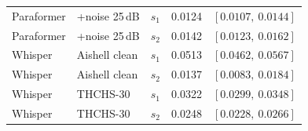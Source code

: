 \documentclass[11pt]{article}
\begin{document}
\begin{table}[t]
\begin{tabular}{lllrc}
    Paraformer & +noise 25\,dB      & $s_1$ & 0.0124 & $[0.0107,\ 0.0144]$ \\
    Paraformer & +noise 25\,dB      & $s_2$ & 0.0142 & $[0.0123,\ 0.0162]$ \\
    Whisper    & Aishell clean      & $s_1$ & 0.0513 & $[0.0462,\ 0.0567]$ \\
    Whisper    & Aishell clean      & $s_2$ & 0.0137 & $[0.0083,\ 0.0184]$ \\
    Whisper    & THCHS-30           & $s_1$ & 0.0322 & $[0.0299,\ 0.0348]$ \\
    Whisper    & THCHS-30           & $s_2$ & 0.0248 & $[0.0228,\ 0.0266]$ \\
    \bottomrule
  \end{tabular}
\end{table}
\end{document}
